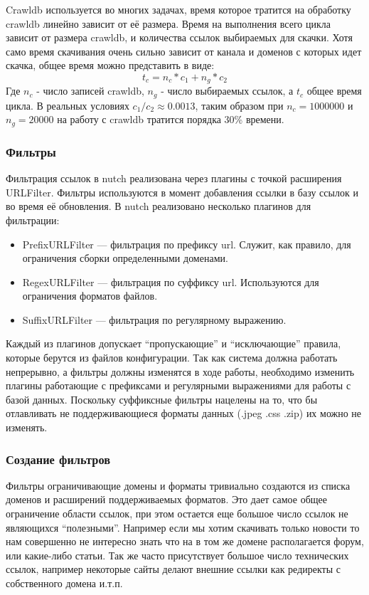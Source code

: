 Crawldb используется во многих задачах, время которое тратится на обработку crawldb линейно зависит от её размера. Время на выполнения всего цикла зависит от размера crawldb, и количества ссылок выбираемых для скачки. Хотя само время скачивания очень сильно зависит от канала и доменов с которых идет скачка, общее время можно представить в виде:
$$t_{c}=n_{c}*c_{1}+n_{g}*c_{2}$$ Где $n_{c}$ - число записей crawldb, $n_{g}$ - число выбираемых ссылок, а $t_{c}$ общее время цикла. В реальных условиях $c_{1}/c_{2}\approx 0.0013$, таким образом при $n_{c}=1000000$ и $n_{g}=20000$ на работу с crawldb тратится порядка 30\% времени. 

\subsubsection*{Фильтры}
Фильтрация ссылок в nutch реализована через плагины с точкой расширения URLFilter. Фильтры используются в момент добавления ссылки в базу ссылок и во время её обновления. В nutch реализовано несколько плагинов для фильтрации:
\begin{itemize}
 \item PrefixURLFilter --- фильтрация по префиксу url. Служит, как правило, для ограничения сборки определенными доменами.
 \item RegexURLFilter --- фильтрация по суффиксу url. Используются для ограничения форматов файлов.
 \item SuffixURLFilter --- фильтрация по регулярному выражению. 
\end{itemize}

Каждый из плагинов допускает ``пропускающие'' и ``исключающие'' правила, которые берутся из файлов конфигурации. 
Так как система должна работать непрерывно, а фильтры должны изменятся в ходе работы, необходимо изменить плагины работающие с префиксами и регулярными выражениями для работы с базой данных. Поскольку суффиксные фильтры нацелены на то, что бы отлавливать не поддерживающиеся форматы данных (.jpeg .css .zip) их можно не изменять.

\subsubsection*{Создание фильтров}
Фильтры ограничивающие домены и форматы тривиально создаются из списка доменов и расширений поддерживаемых форматов. Это дает самое общее ограничение области ссылок, при этом остается еще большое число ссылок не являющихся ``полезными''.
Например если мы хотим скачивать только новости то нам совершенно не интересно знать что на в том же домене располагается форум, или какие-либо статьи. Так же часто присутствует большое число технических ссылок, например некоторые сайты делают внешние ссылки как редиректы с собственного домена и.т.п.

